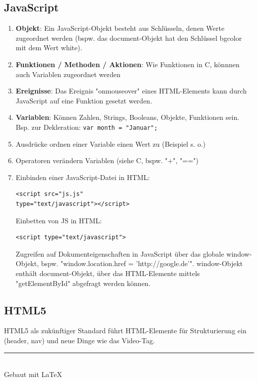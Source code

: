 \documentclass[12pt,landscape]{article}
\begin{document}
\begin{multicols}{3}
\subsection{JavaScript}
\begin{enumerate}
\item \textbf{Objekt}: Ein JavaScript-Objekt besteht aus Schlüsseln, denen Werte zugeordnet werden (bspw. das document-Objekt hat den Schlüssel bgcolor mit dem Wert white).
\item \textbf{Funktionen / Methoden / Aktionen}: Wie Funktionen in C, könnnen auch Variablen zugeordnet werden
\item \textbf{Ereignisse}: Das Ereignis "onmouseover" eines HTML-Elements kann durch JavaScript auf eine Funktion gesetzt werden.
\item \textbf{Variablen}: Können Zahlen, Strings, Booleans, Objekte, Funktionen sein. Bsp. zur Dekleration: \lstinline|var month = "Januar";|
\item Ausdrücke ordnen einer Variable einen Wert zu (Beispiel s. o.)
\item Operatoren verändern Variablen (siehe C, bspw. "+", "==")
\item Einbinden einer JavaScript-Datei in HTML: \begin{lstlisting}
<script src="js.js"
type="text/javascript"></script>
\end{lstlisting}
Einbetten von JS in HTML:
\begin{lstlisting}
<script type="text/javascript">
\end{lstlisting}
Zugreifen auf Dokumenteigenschaften in JavaScript über das globale window-Objekt, bspw. "window.location.href = 'http://google.de'". window-Objekt enthält document-Objekt, über das HTML-Elemente mittels "getElementById" abgefragt werden können.\\
\end{enumerate}
\subsection{HTML5}
HTML5 als zukünftiger Standard führt HTML-Elemente für Strukturierung ein (header, nav) und neue Dinge wie das Video-Tag.\\

\rule{0.3\linewidth}{0.25pt}
\scriptsize \\
Gebaut mit \LaTeX
\end{multicols}
\end{document}
